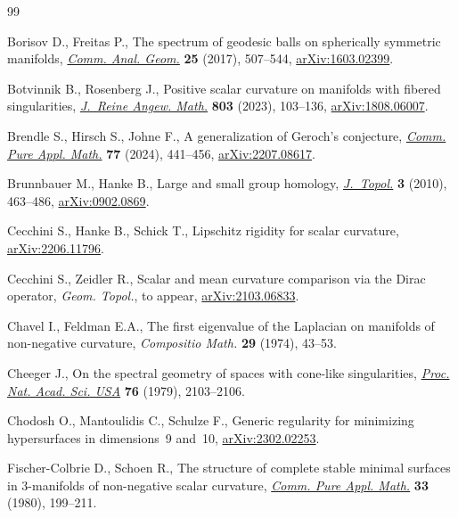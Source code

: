 \documentclass[pdftex]{sigma}
\numberwithin{equation}{section}
\begin{document}
\begin{thebibliography}{99}
\footnotesize\itemsep=0pt

Borisov D., Freitas P., The spectrum of geodesic balls on spherically symmetric
  manifolds, \href{https://doi.org/10.4310/CAG.2017.v25.n3.a1}{\textit{Comm. Anal. Geom.}} \textbf{25} (2017), 507--544,
  \href{https://arxiv.org/abs/1603.02399}{arXiv:1603.02399}.

Botvinnik B., Rosenberg J., Positive scalar curvature on manifolds with fibered
  singularities, \href{https://doi.org/10.1515/crelle-2023-0055}{\textit{J.~Reine Angew. Math.}} \textbf{803} (2023), 103--136,
  \href{https://arxiv.org/abs/1808.06007}{arXiv:1808.06007}.

Brendle S., Hirsch S., Johne F., A generalization of {G}eroch's conjecture,
  \href{https://doi.org/10.1002/cpa.22137}{\textit{Comm. Pure Appl. Math.}} \textbf{77} (2024), 441--456,
  \href{https://arxiv.org/abs/2207.08617}{arXiv:2207.08617}.

Brunnbauer M., Hanke B., Large and small group homology, \href{https://doi.org/10.1112/jtopol/jtq014}{\textit{J.~Topol.}}
  \textbf{3} (2010), 463--486, \href{https://arxiv.org/abs/0902.0869}{arXiv:0902.0869}.

Cecchini S., Hanke B., Schick T., Lipschitz rigidity for scalar curvature,
  \href{https://arxiv.org/abs/2206.11796}{arXiv:2206.11796}.

Cecchini S., Zeidler R., Scalar and mean curvature comparison via the {D}irac
  operator, \textit{Geom. Topol.}, {t}o appear, \href{https://arxiv.org/abs/2103.06833}{arXiv:2103.06833}.

Chavel I., Feldman E.A., The first eigenvalue of the {L}aplacian on manifolds
  of non-negative curvature, \textit{Compositio Math.} \textbf{29} (1974),
  43--53.

Cheeger J., On the spectral geometry of spaces with cone-like singularities,
  \href{https://doi.org/10.1073/pnas.76.5.2103}{\textit{Proc. Nat. Acad. Sci. USA}} \textbf{76} (1979), 2103--2106.

Chodosh O., Mantoulidis C., Schulze F., Generic regularity for minimizing
  hypersurfaces in dimensions~9 and~10, \href{https://arxiv.org/abs/2302.02253}{arXiv:2302.02253}.

Fischer-Colbrie D., Schoen R., The structure of complete stable minimal
  surfaces in {$3$}-manifolds of non-negative scalar curvature, \href{https://doi.org/10.1002/cpa.3160330206}{\textit{Comm.
  Pure Appl. Math.}} \textbf{33} (1980), 199--211.


\end{thebibliography}
\end{document}
